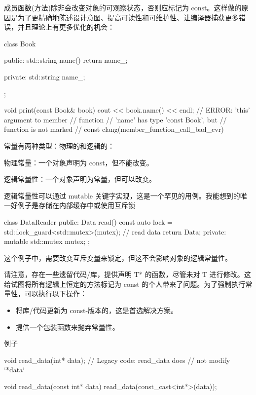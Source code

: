 
成员函数(方法)除非会改变对象的可观察状态，否则应标记为 const。这样做的原因是为了更精确地陈述设计意图、提高可读性和可维护性、让编译器捕获更多错误，并且理论上有更多优化的机会：

\begin{cpp}
class Book {
public:
    std::string name() { return name_; }

private:
    std::string name_;
};

void print(const Book& book) {
    cout << book.name()
        << endl; // ERROR: 'this' argument to member
                 // function
                 // 'name' has type 'const Book', but
                 // function is not marked
                 // const clang(member_function_call_bad_cvr)
}
\end{cpp}

常量有两种类型：物理的和逻辑的：

物理常量：一个对象声明为 const，但不能改变。

逻辑常量性：一个对象声明为常量，但可以改变。

逻辑常量性可以通过 mutable 关键字实现，这是一个罕见的用例。我能想到的唯一好例子是存储在内部缓存中或使用互斥锁

\begin{cpp}
class DataReader {
public:
    Data read() const {
        auto lock = std::lock_guard<std::mutex>(mutex);
        // read data
        return Data{};
    }
private:
    mutable std::mutex mutex;
};
\end{cpp}

这个例子中，需要改变互斥变量来锁定，但这不会影响对象的逻辑常量性。

请注意，存在一些遗留代码/库，提供声明 T* 的函数，尽管未对 T 进行修改。这给试图将所有逻辑上恒定的方法标记为 const 的个人带来了问题。为了强制执行常量性，可以执行以下操作：

\begin{itemize}
\item
将库/代码更新为 const-版本的，这是首选解决方案。

\item
提供一个包装函数来抛弃常量性。
\end{itemize}

例子

\begin{cpp}
void read_data(int* data); // Legacy code: read_data does
                           // not modify `*data`

void read_data(const int* data) {
    read_data(const_cast<int*>(data));
}
\end{cpp}

